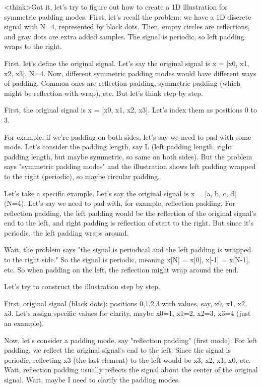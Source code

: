 <think>Got it, let's try to figure out how to create a 1D illustration for symmetric padding modes. First, let's recall the problem: we have a 1D discrete signal with N=4, represented by black dots. Then, empty circles are reflections, and gray dots are extra added samples. The signal is periodic, so left padding wraps to the right.

First, let's define the original signal. Let's say the original signal is x = [x0, x1, x2, x3], N=4. Now, different symmetric padding modes would have different ways of padding. Common ones are reflection padding, symmetric padding (which might be reflection with wrap), etc. But let's think step by step.

First, the original signal is x = [x0, x1, x2, x3]. Let's index them as positions 0 to 3.

For example, if we're padding on both sides, let's say we need to pad with some mode. Let's consider the padding length, say L (left padding length, right padding length, but maybe symmetric, so same on both sides). But the problem says "symmetric padding modes" and the illustration shows left padding wrapped to the right (periodic), so maybe circular padding.

Let's take a specific example. Let's say the original signal is x = [a, b, c, d] (N=4). Let's say we need to pad with, for example, reflection padding. For reflection padding, the left padding would be the reflection of the original signal's end to the left, and right padding is reflection of start to the right. But since it's periodic, the left padding wraps around.

Wait, the problem says "the signal is periodical and the left padding is wrapped to the right side." So the signal is periodic, meaning x[N] = x[0], x[-1] = x[N-1], etc. So when padding on the left, the reflection might wrap around the end.

Let's try to construct the illustration step by step.

First, original signal (black dots): positions 0,1,2,3 with values, say, x0, x1, x2, x3. Let's assign specific values for clarity, maybe x0=1, x1=2, x2=3, x3=4 (just an example).

Now, let's consider a padding mode, say "reflection padding" (first mode). For left padding, we reflect the original signal's end to the left. Since the signal is periodic, reflecting x3 (the last element) to the left would be x3, x2, x1, x0, etc. Wait, reflection padding usually reflects the signal about the center of the original signal. Wait, maybe I need to clarify the padding modes.

